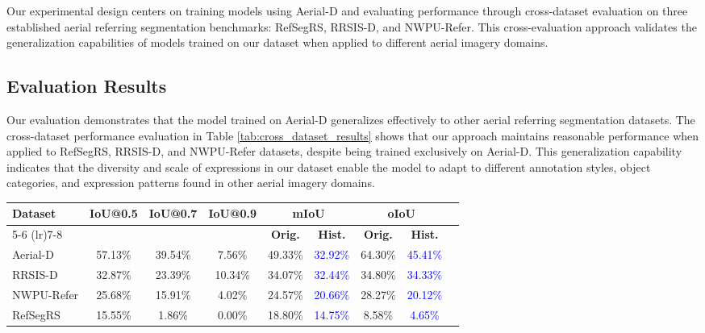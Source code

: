 Our experimental design centers on training models using Aerial-D and evaluating performance through cross-dataset evaluation on three established aerial referring segmentation benchmarks: RefSegRS, RRSIS-D, and NWPU-Refer. This cross-evaluation approach validates the generalization capabilities of models trained on our dataset when applied to different aerial imagery domains.

\subsection{Evaluation Results}
\label{subsec:evaluation_results}

Our evaluation demonstrates that the model trained on Aerial-D generalizes effectively to other aerial referring segmentation datasets. The cross-dataset performance evaluation in Table \ref{tab:cross_dataset_results} shows that our approach maintains reasonable performance when applied to RefSegRS, RRSIS-D, and NWPU-Refer datasets, despite being trained exclusively on Aerial-D. This generalization capability indicates that the diversity and scale of expressions in our dataset enable the model to adapt to different annotation styles, object categories, and expression patterns found in other aerial imagery domains.

\begin{table*}[t]
\centering
\caption{Cross-Dataset Performance Evaluation - Model Trained on Aerial-D Only (Historic-filtered results in \textcolor{blue}{blue})}
\label{tab:cross_dataset_results}
\begin{tabular}{@{}lcccccccc@{}}
\toprule
\textbf{Dataset} & \textbf{IoU@0.5} & \textbf{IoU@0.7} & \textbf{IoU@0.9} & \multicolumn{2}{c}{\textbf{mIoU}} & \multicolumn{2}{c}{\textbf{oIoU}} \\
\cmidrule(lr){5-6} \cmidrule(lr){7-8}
 & & & & \textbf{Orig.} & \textbf{Hist.} & \textbf{Orig.} & \textbf{Hist.} \\
\midrule
Aerial-D & 57.13\% & 39.54\% & 7.56\% & 49.33\% & \textcolor{blue}{32.92\%} & 64.30\% & \textcolor{blue}{45.41\%} \\
RRSIS-D & 32.87\% & 23.39\% & 10.34\% & 34.07\% & \textcolor{blue}{32.44\%} & 34.80\% & \textcolor{blue}{34.33\%} \\
NWPU-Refer & 25.68\% & 15.91\% & 4.02\% & 24.57\% & \textcolor{blue}{20.66\%} & 28.27\% & \textcolor{blue}{20.12\%} \\
RefSegRS & 15.55\% & 1.86\% & 0.00\% & 18.80\% & \textcolor{blue}{14.75\%} & 8.58\% & \textcolor{blue}{4.65\%} \\
\bottomrule
\end{tabular}
\end{table*}

